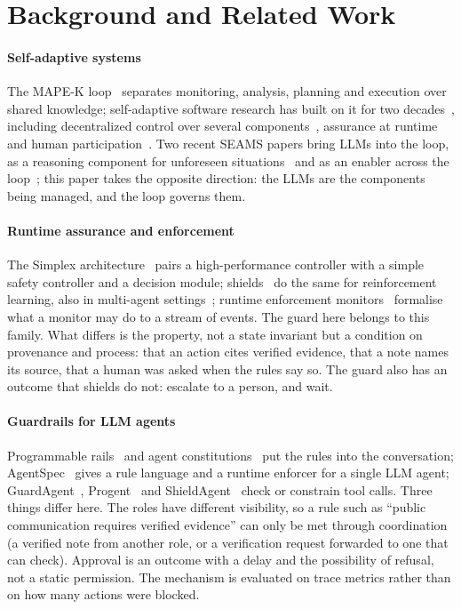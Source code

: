 \documentclass[10pt,conference]{IEEEtran}
\begin{document}
\section{Background and Related Work}
\label{sec:related}

\paragraph{Self-adaptive systems}
The MAPE-K loop~\cite{kephart2003autonomic} separates monitoring, analysis, planning and execution over shared knowledge; self-adaptive software research has built on it for two decades~\cite{salehie2009,weyns2020}, including decentralized control over several components~\cite{weyns2013patterns}, assurance at runtime~\cite{calinescu2018entrust} and human participation~\cite{camara2015human,li2020explanations}. Two recent SEAMS papers bring LLMs into the loop, as a reasoning component for unforeseen situations~\cite{maper2026} and as an enabler across the loop~\cite{li2024llmsas}; this paper takes the opposite direction: the LLMs are the components being managed, and the loop governs them.

\paragraph{Runtime assurance and enforcement}
The Simplex architecture~\cite{sha2001simplex} pairs a high-performance controller with a simple safety controller and a decision module; shields~\cite{alshiekh2018safe} do the same for reinforcement learning, also in multi-agent settings~\cite{elsayedaly2021shielding,compositional2025shielding}; runtime enforcement monitors~\cite{falcone2011enforcement} formalise what a monitor may do to a stream of events. The guard here belongs to this family. What differs is the property, not a state invariant but a condition on provenance and process: that an action cites verified evidence, that a note names its source, that a human was asked when the rules say so. The guard also has an outcome that shields do not: escalate to a person, and wait.

\paragraph{Guardrails for LLM agents}
Programmable rails~\cite{rebedea2023nemo} and agent constitutions~\cite{hua2024trustagent} put the rules into the conversation; AgentSpec~\cite{wang2026agentspec} gives a rule language and a runtime enforcer for a single LLM agent; GuardAgent~\cite{xiang2025guardagent}, Progent~\cite{shi2025progent} and ShieldAgent~\cite{chen2025shieldagent} check or constrain tool calls. Three things differ here. The roles have different visibility, so a rule such as ``public communication requires verified evidence'' can only be met through coordination (a verified note from another role, or a verification request forwarded to one that can check). Approval is an outcome with a delay and the possibility of refusal, not a static permission. The mechanism is evaluated on trace metrics rather than on how many actions were blocked.
\end{document}
